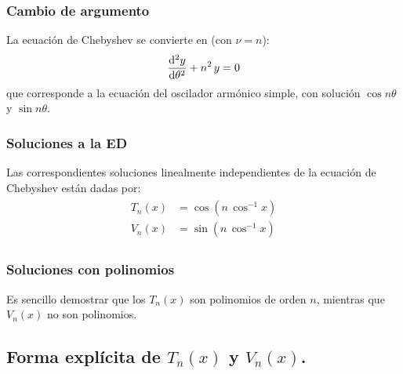 \documentclass[12pt]{beamer}
\begin{document}
\begin{frame}
\frametitle{Cambio de argumento}
La ecuación de Chebyshev se convierte en (con $\nu = n$):
\pause
\begin{align*}
\dv[2]{y}{\theta} + n^{2} \, y = 0
\end{align*}
que corresponde a la ecuación del oscilador armónico simple, con solución $\cos n \theta$ y $\sin n \theta$. 
\end{frame}
\begin{frame}
\frametitle{Soluciones a la ED}
Las correspondientes soluciones linealmente independientes de la ecuación de Chebyshev están dadas por:
\pause
\begin{align}
\begin{aligned}
T_{n} (x) &= \cos (n \, \cos^{-1} x) \\[0.5em]
V_{n} (x) &= \sin (n \, \cos^{-1} x)
\end{aligned}
\label{eq:ecuacion_18_055}
\end{align}
\end{frame}
\begin{frame}
\frametitle{Soluciones con polinomios}
Es sencillo demostrar que los $T_{n} (x)$ son polinomios de orden $n$, mientras que $V_{n} (x)$ no son polinomios.
\end{frame}

\subsection{Forma explícita de \texorpdfstring{$T_{n}(x)$}{T(n)(x)} y \texorpdfstring{$V_{n}(x)$}{Vn(x)}.}
\end{document}
